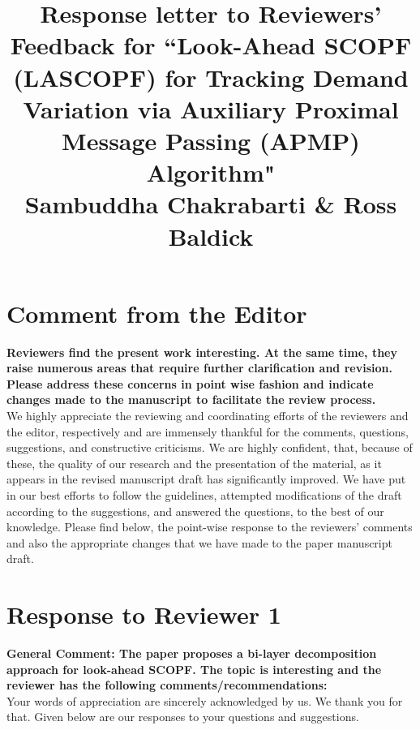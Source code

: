 \documentclass[8pt]{article}
\begin{document}
\title{
	\textbf{Response letter to Reviewers' Feedback for ``Look-Ahead SCOPF (LASCOPF) for Tracking Demand Variation via Auxiliary Proximal Message Passing (APMP) Algorithm"}\\\vspace{5mm}\small{\textbf{Sambuddha Chakrabarti \& Ross Baldick}}
}
\maketitle
\noindent\author{}
\vspace*{-10mm}
\section{Comment from the Editor}
\noindent\textbf{Reviewers find the present work interesting.  At the same time, they raise numerous areas that require further clarification and revision.  Please address these concerns in point wise fashion and indicate changes made to the manuscript to facilitate the review process. }\\

We highly appreciate the reviewing and coordinating efforts of the reviewers and the editor, respectively and are immensely thankful for the comments, questions, suggestions, and constructive criticisms. We are highly confident, that, because of these, the quality of our research and the presentation of the material, as it appears in the revised manuscript draft has significantly improved. We have put in our best efforts to follow the guidelines, attempted modifications of the draft according to the suggestions, and answered the questions, to the best of our knowledge. Please find below, the point-wise response to the reviewers' comments and also the appropriate changes that we have made to the paper manuscript draft.\\

\section{Response to Reviewer 1}
\noindent\textbf{General Comment: The paper proposes a bi-layer decomposition approach for look-ahead SCOPF.  The topic is interesting and the reviewer has the following comments/recommendations:}\\

Your words of appreciation are sincerely acknowledged by us. We thank you for that. Given below are our responses to your questions and suggestions.\\
\end{document}
